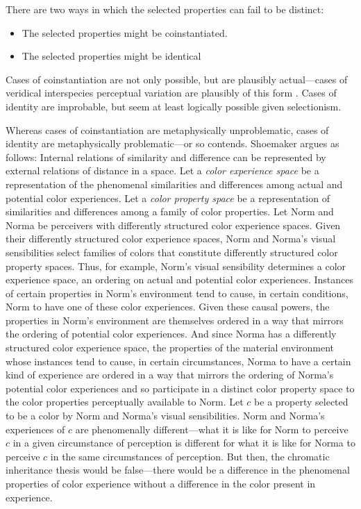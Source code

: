 \documentclass[12pt]{article}
\begin{document}
There are two ways in which the selected properties can fail to be distinct: 
\begin{itemize}
	\item The selected properties might be coinstantiated. 
	\item The selected properties might be identical
\end{itemize}
Cases of coinstantiation are not only possible, but are plausibly actual---cases of veridical interspecies perceptual variation are plausibly of this form \citep[see, for example,][]{Allen:2005be}. Cases of identity are improbable, but seem at least logically possible given selectionism. 

Whereas cases of coinstantiation are metaphysically unproblematic, cases of identity are metaphysically problematic---or so \citet[]{Shoemaker:wk} contends. Shoemaker argues as follows: Internal relations of similarity and difference can be represented by external relations of distance in a space. Let a \emph{color experience space} be a representation of the phenomenal similarities and differences among actual and potential color experiences. Let a \emph{color property space} be a representation of similarities and differences among a family of color properties. Let Norm and Norma be perceivers with differently structured color experience spaces. Given their differently structured color experience spaces, Norm and Norma's visual sensibilities select families of colors that constitute differently structured color property spaces. Thus, for example, Norm's visual sensibility determines a color experience space, an ordering on actual and potential color experiences. Instances of certain properties in Norm's environment tend to cause, in certain conditions, Norm to have one of these color experiences. Given these causal powers, the properties in Norm's environment are themselves ordered in a way that mirrors the ordering of potential color experiences. And since Norma has a differently structured color experience space, the properties of the material environment whose instances tend to cause, in certain circumstances, Norma to have a certain kind of experience are ordered in a way that mirrors the ordering of Norma's potential color experiences and so participate in a distinct color property space to the color properties perceptually available to Norm. Let \( c \) be a property selected to be a color by Norm and Norma's visual sensibilities. Norm and Norma's experiences of \( c \) are phenomenally different---what it is like for Norm to perceive \( c \) in a given circumstance of perception is different for what it is like for Norma to perceive \( c \) in the same circumstances of perception. But then, the chromatic inheritance thesis would be false---there would be a difference in the phenomenal properties of color experience without a difference in the color present in experience.
\end{document}
